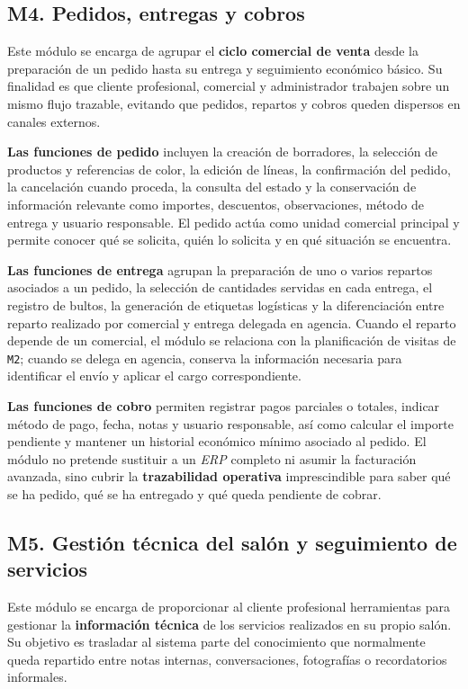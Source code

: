 \subsection{M4. Pedidos, entregas y cobros}

Este módulo se encarga de agrupar el \textbf{ciclo comercial de venta} desde la preparación de un pedido hasta su entrega y seguimiento económico básico. Su finalidad es que cliente profesional, comercial y administrador trabajen sobre un mismo flujo trazable, evitando que pedidos, repartos y cobros queden dispersos en canales externos.

\textbf{Las funciones de pedido} incluyen la creación de borradores, la selección de productos y referencias de color, la edición de líneas, la confirmación del pedido, la cancelación cuando proceda, la consulta del estado y la conservación de información relevante como importes, descuentos, observaciones, método de entrega y usuario responsable. El pedido actúa como unidad comercial principal y permite conocer qué se solicita, quién lo solicita y en qué situación se encuentra.

\textbf{Las funciones de entrega} agrupan la preparación de uno o varios repartos asociados a un pedido, la selección de cantidades servidas en cada entrega, el registro de bultos, la generación de etiquetas logísticas y la diferenciación entre reparto realizado por comercial y entrega delegada en agencia. Cuando el reparto depende de un comercial, el módulo se relaciona con la planificación de visitas de \texttt{M2}; cuando se delega en agencia, conserva la información necesaria para identificar el envío y aplicar el cargo correspondiente.

\textbf{Las funciones de cobro} permiten registrar pagos parciales o totales, indicar método de pago, fecha, notas y usuario responsable, así como calcular el importe pendiente y mantener un historial económico mínimo asociado al pedido. El módulo no pretende sustituir a un \textit{ERP} completo ni asumir la facturación avanzada, sino cubrir la \textbf{trazabilidad operativa} imprescindible para saber qué se ha pedido, qué se ha entregado y qué queda pendiente de cobrar.

\subsection{M5. Gestión técnica del salón y seguimiento de servicios}

Este módulo se encarga de proporcionar al cliente profesional herramientas para gestionar la \textbf{información técnica} de los servicios realizados en su propio salón. Su objetivo es trasladar al sistema parte del conocimiento que normalmente queda repartido entre notas internas, conversaciones, fotografías o recordatorios informales.

